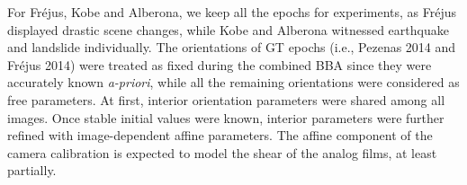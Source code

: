 For Fr{\'e}jus, Kobe and Alberona, we keep all the epochs for experiments, as Fr{\'e}jus displayed drastic scene changes, while Kobe and Alberona witnessed earthquake and landslide individually. 
The orientations of \ac{GT} epochs (i.e., Pezenas 2014 and Fr{\'e}jus 2014) were treated as fixed during the combined \ac{BBA} since they were accurately known \textit{a-priori}, while all the remaining orientations were considered as free parameters. At first, {interior orientation parameters} were shared among all images. Once stable initial values were known, interior parameters were further refined with image-dependent affine parameters. The affine component of the camera calibration is expected to model the shear of the analog films, at least partially.\\


